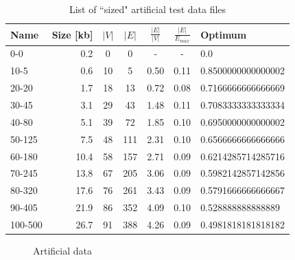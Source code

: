 \documentclass[a4paper,12pt,oneside]{report}
\theoremstyle{definition}
\begin{document}
\begin{table}
  \caption{List of ``sized" artificial test data files}
  \bigskip
  \label{table-experiments-data-artificial-size}
  \centering
  \begin{tabular}{l | r | c | c | c | c | l}
	Name  & Size [kb] & $|V|$ & $|E|$ & $\frac{|E|}{|V|}$ & $\frac{|E|}{E_{max}}$ & Optimum \\
	\hline
	0-0     & 0.2  & 0  & 0   & -    & -    & 0.0                \\
	10-5    & 0.6  & 10 & 5   & 0.50 & 0.11 & 0.8500000000000002 \\ 
  20-20   & 1.7  & 18 & 13  & 0.72 & 0.08 & 0.7166666666666669 \\
  30-45   & 3.1  & 29 & 43  & 1.48 & 0.11 & 0.7083333333333334 \\ 
	40-80   & 5.1  & 39 & 72  & 1.85 & 0.10 & 0.6950000000000002 \\
	50-125  & 7.5  & 48 & 111 & 2.31 & 0.10 & 0.6566666666666666 \\
	60-180  & 10.4 & 58 & 157 & 2.71 & 0.09 & 0.6214285714285716 \\
	70-245  & 13.8 & 67 & 205 & 3.06 & 0.09 & 0.5982142857142856 \\
	80-320  & 17.6 & 76 & 261 & 3.43 & 0.09 & 0.5791666666666667 \\
	90-405  & 21.9 & 86 & 352 & 4.09 & 0.10 & 0.528888888888889  \\
	100-500 & 26.7 & 91 & 388 & 4.26 & 0.09 & 0.4981818181818182 \\
  \end{tabular}
\end{table}

\begin{figure}
  \caption{Artificial data}
  \label{image-experiments-data-artificial}
  \centering
\end{figure}
\end{document}
